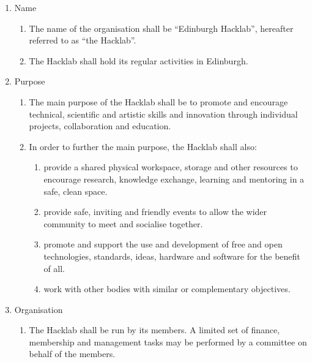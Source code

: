 \documentclass{article}
\begin{document}
\begin{enumerate}
  \item Name
    \begin{enumerate}
      \item The name of the organisation shall be ``Edinburgh
        Hacklab'', hereafter referred to as ``the Hacklab''.
      \item The Hacklab shall hold its regular activities in Edinburgh.
    \end{enumerate} %
  \item Purpose
    \begin{enumerate}
      \item The main purpose of the Hacklab shall be to promote and
        encourage technical, scientific and artistic skills and
        innovation through individual projects, collaboration and
        education.
      \item In order to further the main purpose, the Hacklab shall also:
        \begin{enumerate}
          \item provide a shared physical workspace, storage and other
            resources to encourage research, knowledge exchange,
            learning and mentoring in a safe, clean space.
          \item provide safe, inviting and friendly events to allow
            the wider community to meet and socialise together.
          \item promote and support the use and development of free
            and open technologies, standards, ideas, hardware and
            software for the benefit of all.
          \item work with other bodies with similar or complementary
            objectives.
        \end{enumerate}
    \end{enumerate} %
  \item Organisation
    \begin{enumerate}
      \item The Hacklab shall be run by its members. A limited set of
        finance, membership and management tasks may be performed by a
        committee on behalf of the members.
        
        
    \end{enumerate}
\end{enumerate}
\end{document}
